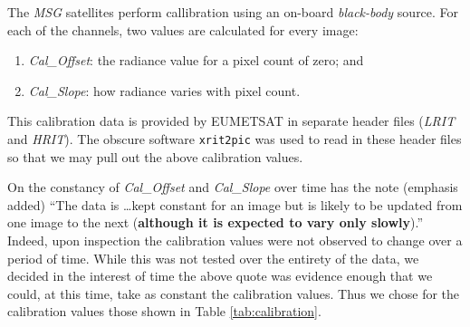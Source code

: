 The \emph{MSG} satellites perform callibration using an on-board
\emph{black-body} source. For each of the channels, two values are
calculated for every image:
\begin{enumerate}
\item \emph{Cal\_Offset}: the radiance value for a pixel count of
  zero; and
\item \emph{Cal\_Slope}: how radiance varies with pixel count.
\end{enumerate}
This calibration data is provided by EUMETSAT in separate header files
(\emph{LRIT} and \emph{HRIT}). The obscure software \texttt{xrit2pic}
was used to read in these header files so that we may pull out the
above calibration values.

On the constancy of \emph{Cal\_Offset} and \emph{Cal\_Slope} over time
\cite{muller2007msg} has the note (emphasis added) ``The data is \dots kept
constant for an image but is likely to be updated from one image to
the next (\textbf{although it is expected to vary only slowly}).''
Indeed, upon inspection the calibration values were not observed to
change over a period of time. While this was not tested over the
entirety of the data, we decided in the interest of time the above
quote was evidence enough that we could, at this time, take as
constant the calibration values. Thus we chose for the calibration
values those shown in Table \ref{tab:calibration}.

\begin{table}
  \centering
  \label{tab:calibration}
\end{table}

